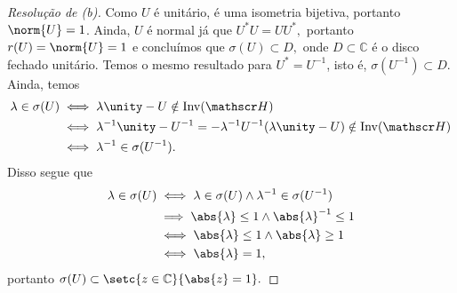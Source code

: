 \begin{proof}[Resolução de (b)]
  Como \(U\) é unitário, é uma isometria bijetiva, portanto \(\norm{U} = 1\). Ainda, \(U\) é normal já que \(U^* U = U U^*,\) portanto \(r(U) = \norm{U} = 1\) e concluímos que \(\sigma(U) \subset D,\) onde \(D \subset \mathbb{C}\) é o disco fechado unitário. Temos o mesmo resultado para \(U^* = U^{-1}\), isto é, \(\sigma(U^{-1}) \subset D\). Ainda, temos
  \begin{align*}
    \lambda \in \sigma(U) &\iff \lambda \unity - U \notin \mathrm{Inv}(\hilbert)\\
                          &\iff \lambda^{-1} \unity - U^{-1} = -\lambda^{-1} U^{-1} (\lambda \unity - U) \notin \mathrm{Inv}(\hilbert)\\
                          &\iff \lambda^{-1} \in \sigma(U^{-1}).
  \end{align*}
  Disso segue que
  \begin{align*}
    \lambda \in \sigma(U) &\iff \lambda \in \sigma(U) \land \lambda^{-1} \in \sigma(U^{-1})\\
    &\implies\abs{\lambda} \leq 1 \land \abs{\lambda}^{-1} \leq 1\\
    &\iff \abs{\lambda} \leq 1 \land \abs{\lambda} \geq 1\\
    &\iff \abs{\lambda} = 1,
  \end{align*}
  portanto \(\sigma(U) \subset \setc{z \in \mathbb{C}}{\abs{z} = 1}.\)


\end{proof}
